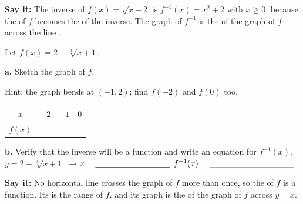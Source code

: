 \textbf{Say it:} The inverse of $f(x)=\sqrt{x-2}$ is $f^{-1}(x)=x^2+2$ with $x\geq0$, because the \blank[2cm] of $f$ becomes the \blank[2cm] of the inverse. The graph of $f^{-1}$ is the \blank[2.4cm] of the graph of $f$ across the line \blank[1.6cm].

Let $f(x)=2-\sqrt[3]{x+1}$.

\begin{minipage}[t]{0.50\textwidth}
\vspace{0pt}
\textbf{a.} Sketch the graph of $f$.

Hint: the graph bends at $(-1,2)$; find $f(-2)$ and $f(0)$ too.

\vspace{4pt}
\begin{tabular}{|c|c|c|c|}\hline
$x$ & $-2$ & $-1$ & $0$ \\ \hline
$f(x)$ & \rule{0pt}{16pt}\hspace{0.9cm} & \hspace{0.9cm} & \hspace{0.9cm} \\ \hline
\end{tabular}

\vspace{8pt}
\textbf{b.} Verify that the inverse will be a function and write an equation for $f^{-1}(x)$.
\lines[1]
$y=2-\sqrt[3]{x+1}$ \quad$\to$\quad $x=\blank[3.2cm]$
\lines[3]
$f^{-1}(x)=\blank[3.6cm]$
\end{minipage}\hfill
\begin{minipage}[t]{0.46\textwidth}
\vspace{0pt}
\end{minipage}

\vspace{6pt}
\textbf{Say it:} No horizontal line crosses the graph of $f$ more than once, so the \blank[2cm] of $f$ is a function. Its \blank[2cm] is the range of $f$, and its graph is the \blank[2.4cm] of the graph of $f$ across $y=x$.

